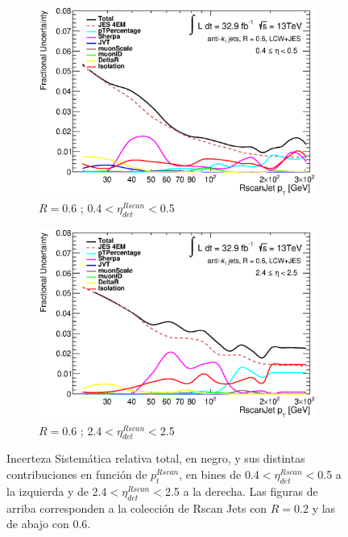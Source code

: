 \begin{figure}[ht]
\begin{subfigure}[b]{0.495\textwidth}
        \includegraphics[width=\textwidth]{images/SumIn2_Eta_49_6LC_wContributions.eps}
        \caption{$R=$0.6 ; 0.4$<\eta^{Rscan}_{det}<$0.5}
    \end{subfigure}
    \hfill
    \begin{subfigure}[b]{0.495\textwidth}
        \centering
        \includegraphics[width=\textwidth]{images/SumIn2_Eta_69_6LC_wContributions.eps}
        \caption{$R=$0.6 ; 2.4$<\eta^{Rscan}_{det}<$2.5}
    \end{subfigure}
    \caption{ Incerteza Sistemática relativa total, en negro, y sus distintas contribuciones en función de $p_t^{Rscan}$, en bines de 0.4$<\eta^{Rscan}_{det}<$0.5 a la izquierda y de 2.4$<\eta^{Rscan}_{det}<$2.5 a la derecha. Las figuras de arriba corresponden a la colección de Rscan Jets con $R=$0.2 y las de abajo con 0.6. } 
    \label{fig:Un}
\end{figure}


